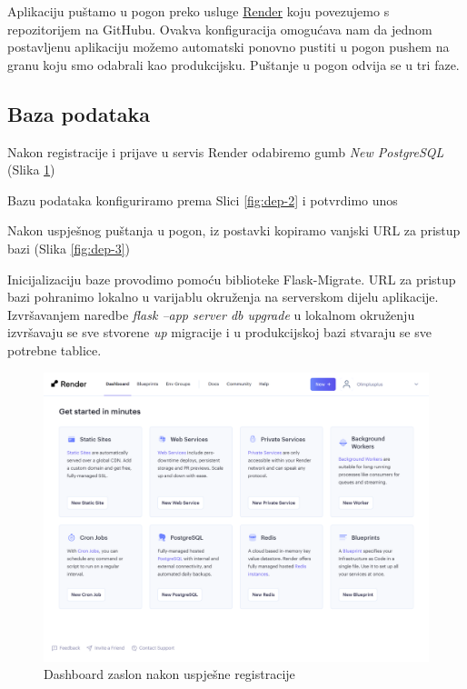         Aplikaciju puštamo u pogon preko usluge \href{https://render.com/}{Render} koju povezujemo s repozitorijem na GitHubu. Ovakva konfiguracija omogućava nam da jednom postavljenu aplikaciju možemo automatski ponovno pustiti u pogon pushem na granu koju smo odabrali kao produkcijsku. Puštanje u pogon odvija se u tri faze.

        \subsection{Baza podataka}

        \begin{packed_item}

            \item Nakon registracije i prijave u servis Render odabiremo gumb \emph{New PostgreSQL} (Slika \ref{fig:dep-1})
            \item Bazu podataka konfiguriramo prema Slici \ref{fig:dep-2} i potvrdimo unos
            \item Nakon uspješnog puštanja u pogon, iz postavki kopiramo vanjski URL za pristup bazi (Slika \ref{fig:dep-3})
            \item Inicijalizaciju baze provodimo pomoću biblioteke Flask-Migrate. URL za pristup bazi pohranimo lokalno u varijablu okruženja na serverskom dijelu aplikacije. Izvršavanjem naredbe \emph{flask --app server db upgrade} u lokalnom okruženju izvršavaju se sve stvorene \emph{up} migracije i u produkcijskoj bazi stvaraju se sve potrebne tablice.
            
        \end{packed_item}

        \begin{figure}[htp]
			\includegraphics[scale=0.17]{slike/deploy_1.png}
			\centering
			\caption{Dashboard zaslon nakon uspješne registracije}
            \label{fig:dep-1}
		\end{figure}


